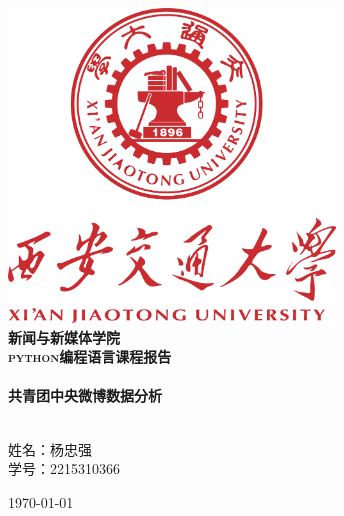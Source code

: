 \begin{titlepage}

\begin{center}


\includegraphics[width=0.65\textwidth]{figure/logo}\\[1cm]    

\textsc{\LARGE \bf 新闻与新媒体学院}\\[1.9cm]

\textsc{\Large \bf python编程语言课程报告}\\[0.5cm]


\HRule \\[0.4cm]
{ \huge \bfseries 共青团中央微博数据分析}\\[0.4cm]

\HRule \\[1.5cm]

\begin{minipage}{0.4\textwidth}
\begin{center} \large

\textsc{\kaishu 姓名：杨忠强\\学号：2215310366}

\end{center}
\end{minipage}

\vfill

{\large \today}

\end{center}

\end{titlepage}

